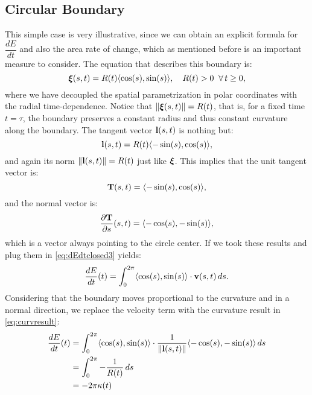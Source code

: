\subsection{Circular Boundary}
This simple case is very illustrative, since we can obtain an explicit formula for $\dfrac{dE}{dt}$ and also the area rate of change, which as mentioned before is an important measure to consider. The equation that describes this boundary is:
\begin{equation}
    \bm{\xi}(s,t) = R(t)\langle \cos(s), \sin(s) \rangle,\quad R(t) > 0 \;\;\forall\,t \geq 0,
    \label{eq:circle}
\end{equation}
where we have decoupled the spatial parametrization in polar coordinates with the radial time-dependence. Notice that $\left\lVert\bm{\xi}(s,t)\right\rVert = R(t)$, that is, for a fixed time $t=\tau$, the boundary preserves a constant radius and thus constant curvature along the boundary. The tangent vector $\mathbf{l}(s,t)$ is nothing but:
\begin{equation*}
    \mathbf{l}(s,t) = R(t)\langle -\sin(s), \cos(s) \rangle,
\end{equation*}
and again its norm $\left\lVert\mathbf{l}(s,t)\right\rVert = R(t)$ just like $\bm{\xi}$. This implies that the unit tangent vector is:
\begin{equation*}
\mathbf{T}(s,t) = \langle -\sin(s), \cos(s) \rangle,
\end{equation*}
and the normal vector is:
\begin{equation*}
    \dfrac{\partial \mathbf{T}}{\partial s}(s,t) = \langle -\cos(s), -\sin(s) \rangle,
\end{equation*}
which is a vector always pointing to the circle center. If we took these results and plug them in \eqref{eq:dEdtclosed3} yields:
\begin{equation*}
    \dfrac{dE}{dt}(t) = \int_0^{2\pi}  \langle \cos(s), \sin(s) \rangle \cdot \mathbf{v}(s,t)\, ds.
\end{equation*}
Considering that the boundary moves proportional to the curvature and in a normal direction, we replace the velocity term with the curvature result in \eqref{eq:curvresult}:
\begin{align}
    \dfrac{dE}{dt}(t) &= \int_0^{2\pi}  \langle \cos(s), \sin(s) \rangle \cdot \frac{1}{\left\lVert\mathbf{l}(s,t)\right\rVert} \langle -\cos(s), -\sin(s) \rangle\, ds \nonumber\\
    &= \int_0^{2\pi} -\frac{1}{R(t)} \,ds \nonumber\\
    &= -2\pi \kappa(t) \label{eq:dEdtcircle}
\end{align}

